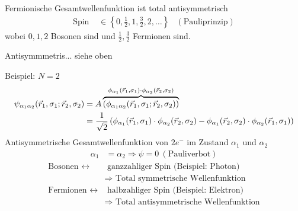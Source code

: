 Fermionische Gesamtwellenfunktion ist total antisymmetrisch
	\begin{align*}
		\text{Spin } &\in \left\{ 0, \frac{1}{2}, 1 , \frac{3}{2}, 2 , \ldots \right\} 
		& (\text{Pauliprinzip})
	\end{align*}
wobei $0, 1 , 2$ Bosonen sind und $\frac{1}{2}, \frac{3}{2}$ Fermionen sind.

Antisymmmetris... siehe oben
	
Beispiel: $N = 2$
	\begin{align*}
		\psi_{\alpha_1 \alpha_2} (\vec{r}_1, \sigma_1; \vec{r}_2, \sigma_2)
		&= A \overbrace{(\phi_{\alpha_1 \alpha_2} (\vec{r}_1, \sigma_1; \vec{r}_2, \sigma_2))}^{\mathclap{\phi_{\alpha_1} (\vec{r}_1, \sigma_1) \cdot \phi_{\alpha_2}(\vec{r}_2, \sigma_2)}} \\
		&= \frac{1}{\sqrt{2}}
		\left(\phi_{\alpha_1} (\vec{r}_1, \sigma_1) \cdot \phi_{\alpha_2}(\vec{r}_2, \sigma_2)
		- \phi_{\alpha_1} (\vec{r}_2, \sigma_2) \cdot \phi_{\alpha_2}(\vec{r}_1, \sigma_1)\right)
	\end{align*}
Antisymmetrische Gesamtwellenfunktion von $2 e^-$ im Zustand $\alpha_1$ und $\alpha_2$ 
	\begin{align*}
		\alpha_1 &= \alpha_2 \Rightarrow \psi = 0 ~(\text{Pauliverbot})
	\end{align*}
	\begin{align*}
		\text{Bosonen } \longleftrightarrow& 
		\text{ ganzzahliger Spin (Beispiel: Photon)} \\
		&\Rightarrow \text{ Total symmetrische Wellenfunktion}\\
		\text{Fermionen } \longleftrightarrow& 
		\text{ halbzahliger Spin (Beispiel: Elektron)} \\
		&\Rightarrow \text{ Total antisymmetrische Wellenfunktion}
	\end{align*}